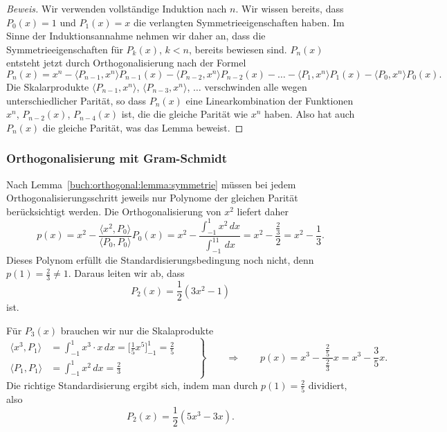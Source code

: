 \begin{proof}[Beweis]
Wir verwenden vollständige Induktion nach $n$.
Wir wissen bereits, dass $P_0(x)=1$ und $P_1(x)=x$ die verlangten
Symmetrieeigenschaften haben.
Im Sinne der Induktionsannahme nehmen wir daher an, dass die
Symmetrieeigenschaften für $P_k(x)$, $k<n$, bereits bewiesen sind.
$P_n(x)$ entsteht jetzt durch Orthogonalisierung nach der Formel
\[
P_n(x)
=
x^n
-
\langle P_{n-1},x^n\rangle P_{n-1}(x)
-
\langle P_{n-2},x^n\rangle P_{n-2}(x)
-\dots-
\langle P_1,x^n\rangle P_1(x)
-
\langle P_0,x^n\rangle P_0(x).
\]
Die Skalarprodukte
$\langle P_{n-1},x^n\rangle$,
$\langle P_{n-3},x^n\rangle$, $\dots$ verschwinden alle wegen
unterschiedlicher Parität, so dass
$P_n(x)$ eine Linearkombination der Funktionen $x^n$, $P_{n-2}(x)$,
$P_{n-4}(x)$ ist, die die gleiche Parität wie $x^n$ haben.
Also hat auch $P_n(x)$ die gleiche Parität, was das Lemma beweist.
\end{proof}

%
%
\subsubsection{Orthogonalisierung mit Gram-Schmidt}
Nach Lemma~\ref{buch:orthogonal:lemma:symmetrie} müssen
bei jedem Orthogonalisierungsschritt jeweils nur Polynome der
gleichen Parität berücksichtigt werden.
Die Orthogonalisierung von $x^2$ liefert daher
\[
p(x) = x^2
-
\frac{\langle x^2,P_0\rangle}{\langle P_0,P_0\rangle} P_0(x)
=
x^2 - \frac{\int_{-1}^1x^2\,dx}{\int_{-1}^11\,dx}
=
x^2 - \frac{\frac{2}{3}}{2}=x^2-\frac13.
\]
Dieses Polynom erfüllt die Standardisierungsbedingung noch 
nicht, denn $p(1)=\frac23\ne 1$.
Daraus leiten wir ab, dass
\[
P_2(x) = \frac12(3x^2-1)
\]
ist.

Für $P_3(x)$ brauchen wir nur die Skalaprodukte
\[
\left.
\begin{aligned}
\langle x^3,P_1\rangle
&=
\int_{-1}^1  x^3\cdot x\,dx
=
\biggl[\frac15x^5\biggr]_{-1}^1
=
\frac25
\qquad
\\
\langle P_1,P_1\rangle
&=
\int_{-1}^1 x^2\,dx
=
\frac23
\end{aligned}
\right\}
\qquad
\Rightarrow
\qquad
p(x) = x^3 - \frac{\;\frac25\;}{\frac23}x=x^3-\frac{3}{5}x.
\]
Die richtige Standardisierung ergibt sich,
indem man durch $p(1)=\frac25$ dividiert, also
\[
P_2(x) = \frac12(5x^3-3x).
\]

